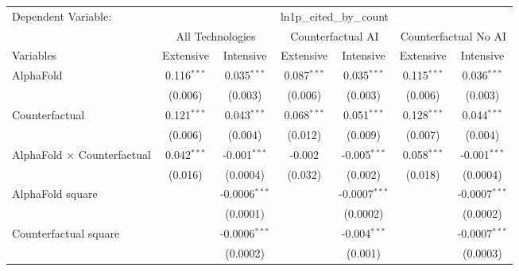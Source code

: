 \begingroup
\centering
\begin{tabular}{lcccccc}
   \tabularnewline \midrule \midrule
   Dependent Variable: & \multicolumn{6}{c}{ln1p\_cited\_by\_count}\\
 & \multicolumn{2}{c}{All Technologies} & \multicolumn{2}{c}{Counterfactual AI} & \multicolumn{2}{c}{Counterfactual No AI} \\
\cmidrule(lr){1-1}\cmidrule(lr){2-3} \cmidrule(lr){4-5} \cmidrule(lr){6-7}
Variables & \multicolumn{1}{c}{Extensive} & \multicolumn{1}{c}{Intensive} & \multicolumn{1}{c}{Extensive} & \multicolumn{1}{c}{Intensive} & \multicolumn{1}{c}{Extensive} & \multicolumn{1}{c}{Intensive} \\
\cmidrule(lr){1-1}\cmidrule(lr){2-2} \cmidrule(lr){3-3} \cmidrule(lr){4-4} \cmidrule(lr){5-5} \cmidrule(lr){6-6} \cmidrule(lr){7-7}
   AlphaFold                          & 0.116$^{***}$ & 0.035$^{***}$     & 0.087$^{***}$ & 0.035$^{***}$    & 0.115$^{***}$ & 0.036$^{***}$\\   
                                      & (0.006)       & (0.003)           & (0.006)       & (0.003)          & (0.006)       & (0.003)\\   
   Counterfactual                     & 0.121$^{***}$ & 0.043$^{***}$     & 0.068$^{***}$ & 0.051$^{***}$    & 0.128$^{***}$ & 0.044$^{***}$\\   
                                      & (0.006)       & (0.004)           & (0.012)       & (0.009)          & (0.007)       & (0.004)\\   
   AlphaFold $\times$ Counterfactual  & 0.042$^{***}$ & -0.001$^{***}$    & -0.002        & -0.005$^{***}$   & 0.058$^{***}$ & -0.001$^{***}$\\   
                                      & (0.016)       & (0.0004)          & (0.032)       & (0.002)          & (0.018)       & (0.0004)\\   
   AlphaFold square                   &               & -0.0006$^{***}$   &               & -0.0007$^{***}$  &               & -0.0007$^{***}$\\   
                                      &               & (0.0001)          &               & (0.0002)         &               & (0.0002)\\   
   Counterfactual square              &               & -0.0006$^{***}$   &               & -0.004$^{***}$   &               & -0.0007$^{***}$\\   
                                      &               & (0.0002)          &               & (0.001)          &               & (0.0003)\\   

\end{tabular}

